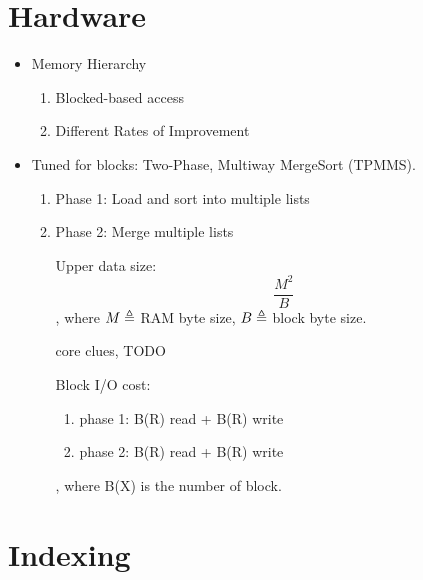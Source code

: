 \documentclass[a4paper]{report}
\begin{document}
\chapter{Hardware}
\begin{itemize}
\item Memory Hierarchy 
\begin{enumerate}
\item Blocked-based access 
\item Different Rates of Improvement 
\end{enumerate}
\item Tuned for blocks: Two-Phase, Multiway MergeSort (TPMMS). 
\begin{enumerate}
\item Phase 1: Load and sort into multiple lists 
\item Phase 2: Merge multiple lists 

Upper data size: 
$$
\frac{M^2}{B}
$$
, where $M\triangleq$ RAM byte size, $B\triangleq$ block byte size. 

core clues, TODO

Block I/O cost:
\begin{enumerate}
\item phase 1: B(R) read + B(R) write 
\item phase 2: B(R) read + B(R) write 
\end{enumerate}
, where B(X) is the number of block. 
\end{enumerate}
\end{itemize}


\chapter{Indexing}
\end{document}
